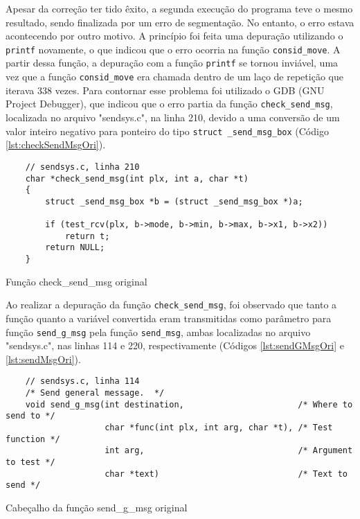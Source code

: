 Apesar da correção ter tido êxito, a segunda execução do programa teve o mesmo resultado, sendo finalizada 
por um erro de segmentação. No entanto, o erro estava acontecendo por outro motivo. A princípio foi 
feita uma depuração utilizando o \verb|printf| novamente, o que indicou que o erro ocorria na função 
\verb|consid_move|. A partir dessa função, a depuração com a função \verb|printf| se tornou inviável, 
uma vez que a função \verb|consid_move| era chamada dentro de um laço de repetição que iterava 338 vezes. 
Para contornar esse problema foi utilizado o GDB (GNU Project Debugger), que indicou que o erro partia 
da função \verb|check_send_msg|, localizada no arquivo "sendsys.c", na linha 210, devido a uma conversão 
de um valor inteiro negativo para ponteiro do tipo \verb|struct _send_msg_box| (Código \ref{lst:checkSendMsgOri}).

\begin{listing}[!ht]
    \begin{verbatim}
    // sendsys.c, linha 210
    char *check_send_msg(int plx, int a, char *t)
    {
        struct _send_msg_box *b = (struct _send_msg_box *)a;

        if (test_rcv(plx, b->mode, b->min, b->max, b->x1, b->x2))
            return t;
        return NULL;
    }
    \end{verbatim}
\caption{Função check\_send\_msg original}
\label{lst:checkSendMsgOri}
\end{listing}

Ao realizar a depuração da função \verb|check_send_msg|, foi observado que tanto a função quanto a 
variável convertida eram transmitidas como parâmetro para função \verb|send_g_msg| pela função 
\verb|send_msg|, ambas localizadas no arquivo "sendsys.c", nas linhas 114 e 220, respectivamente 
(Códigos \ref{lst:sendGMsgOri} e \ref{lst:sendMsgOri}).

\begin{listing}[!ht]
    \begin{verbatim}
    // sendsys.c, linha 114
    /* Send general message.  */
    void send_g_msg(int destination,                       /* Where to send to */
                    char *func(int plx, int arg, char *t), /* Test function */
                    int arg,                               /* Argument to test */
                    char *text)                            /* Text to send */
    \end{verbatim}
\caption{Cabeçalho da função send\_g\_msg original}
\label{lst:sendGMsgOri}
\end{listing}

